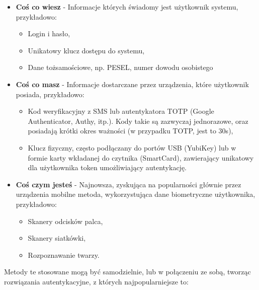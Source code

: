 \begin{itemize}
	\item \textbf{Coś co wiesz} - Informacje których świadomy jest użytkownik systemu, przykładowo:
	\begin{itemize}
		\item Login i hasło,
		\item Unikatowy klucz dostępu do systemu,
		\item Dane tożsamościowe, np. PESEL, numer dowodu osobistego
	\end{itemize}
	\item \textbf{Coś co masz} - Informacje dostarczane przez urządzenia, które użytkownik posiada, przykładowo:
	\begin{itemize}
		\item Kod weryfikacyjny z SMS lub autentykatora TOTP (Google Authenticator, Authy, itp.). Kody takie są zazwyczaj jednorazowe, oraz posiadają krótki okres ważności (w przypadku TOTP, jest to 30s),
		\item Klucz fizyczny, często podłączany do portów USB (YubiKey) lub w formie karty wkładanej do czytnika (SmartCard), zawierający unikatowy dla użytkownika token umożliwiający autentykację.
	\end{itemize}
	\item \textbf{Coś czym jesteś} - Najnowsza, zyskująca na popularności głównie przez urządzenia mobilne metoda, wykorzystująca dane biometryczne użytkownika, przykładowo:

	\begin{itemize}
		\item Skanery odcisków palca,
		\item Skanery siatkówki,
		\item Rozpoznawanie twarzy.
	\end{itemize}
\end{itemize}

Metody te stosowane mogą być samodzielnie, lub w połączeniu ze sobą, tworząc rozwiązania autentykacyjne, z których najpopularniejsze to:



